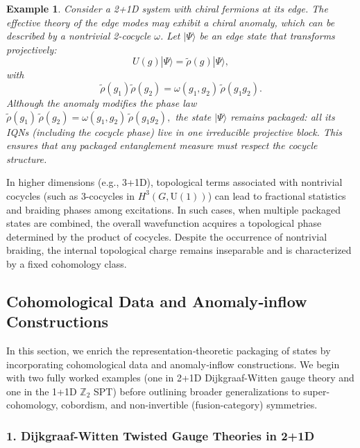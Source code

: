 \documentclass[12pt,a4paper]{article}
\newtheorem{example}{Example}
\begin{document}
\begin{example}
	Consider a 2+1D system with chiral fermions at its edge.
	The effective theory of the edge modes may exhibit a chiral anomaly, which can be described by a nontrivial 2-cocycle $\omega$.
	Let $|\Psi\rangle$ be an edge state that transforms projectively:
	\[
	U(g)|\Psi\rangle = \tilde{\rho}(g)|\Psi\rangle,
	\]
	with
	\[
	\tilde{\rho}(g_1)\tilde{\rho}(g_2) = \omega(g_1,g_2)\, \tilde{\rho}(g_1g_2).
	\]
	Although the anomaly modifies the phase law
	$\tilde\rho(g_1)\,\tilde\rho(g_2)=\omega(g_1,g_2)\,\tilde\rho(g_1g_2),$
	the state $\lvert\Psi\rangle$ remains packaged: all its IQNs (including the cocycle phase) live in one irreducible projective block.
	This ensures that any packaged entanglement measure must respect the cocycle structure.
\end{example}


In higher dimensions (e.g., 3+1D), topological terms associated with nontrivial cocycles (such as 3-cocycles in $H^3(G, \mathrm{U}(1))$) can lead to fractional statistics and braiding phases among excitations.
In such cases, when multiple packaged states are combined, the overall wavefunction acquires a topological phase determined by the product of cocycles.
Despite the occurrence of nontrivial braiding, the internal topological charge remains inseparable and is characterized by a fixed cohomology class.




\subsection{Cohomological Data and Anomaly‐inflow Constructions}
\label{SEC:CohomologicalDataAndAnomalyInflowConstructions}

In this section, we enrich the representation‐theoretic packaging of states by incorporating cohomological data and anomaly‐inflow constructions.
We begin with two fully worked examples (one in 2+1D Dijkgraaf-Witten gauge theory and one in the 1+1D $\mathbb Z_2$ SPT) before outlining broader generalizations to super-cohomology, cobordism, and non-invertible (fusion-category) symmetries.



\subsubsection*{1. Dijkgraaf-Witten Twisted Gauge Theories in 2+1D}
\end{document}
